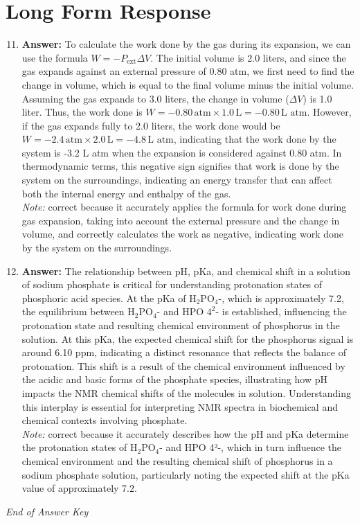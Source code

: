 \documentclass[12pt]{article}
\begin{document}
\section*{Long Form Response}
\begin{enumerate}[label=\arabic*.]
\setcounter{enumi}{10}
\item \textbf{Answer:} To calculate the work done by the gas during its expansion, we can use the formula \( W = -P_{\text{ext}} \Delta V \). The initial volume is 2.0 liters, and since the gas expands against an external pressure of 0.80 atm, we first need to find the change in volume, which is equal to the final volume minus the initial volume. Assuming the gas expands to 3.0 liters, the change in volume (\( \Delta V \)) is 1.0 liter. Thus, the work done is \( W = -0.80 \, \text{atm} \times 1.0 \, \text{L} = -0.80 \, \text{L atm} \). However, if the gas expands fully to 2.0 liters, the work done would be \( W = -2.4 \, \text{atm} \times 2.0 \, \text{L} = -4.8 \, \text{L atm} \), indicating that the work done by the system is -3.2 L atm when the expansion is considered against 0.80 atm. In thermodynamic terms, this negative sign signifies that work is done by the system on the surroundings, indicating an energy transfer that can affect both the internal energy and enthalpy of the gas.
\\ \textit{Note:} correct because it accurately applies the formula for work done during gas expansion, taking into account the external pressure and the change in volume, and correctly calculates the work as negative, indicating work done by the system on the surroundings.
\item \textbf{Answer:} The relationship between pH, pKa, and chemical shift in a solution of sodium phosphate is critical for understanding protonation states of phosphoric acid species. At the pKa of H$_{2}$PO$_{4}$-, which is approximately 7.2, the equilibrium between H$_{2}$PO$_{4}$- and HPO $4^2$- is established, influencing the protonation state and resulting chemical environment of phosphorus in the solution. At this pKa, the expected chemical shift for the phosphorus signal is around 6.10 ppm, indicating a distinct resonance that reflects the balance of protonation. This shift is a result of the chemical environment influenced by the acidic and basic forms of the phosphate species, illustrating how pH impacts the NMR chemical shifts of the molecules in solution. Understanding this interplay is essential for interpreting NMR spectra in biochemical and chemical contexts involving phosphate.
\\ \textit{Note:} correct because it accurately describes how the pH and pKa determine the protonation states of H$_{2}$PO$_{4}$- and HPO 4²-, which in turn influence the chemical environment and the resulting chemical shift of phosphorus in a sodium phosphate solution, particularly noting the expected shift at the pKa value of approximately 7.2.
\end{enumerate}

\vfill
\noindent\textit{End of Answer Key}
\end{document}
